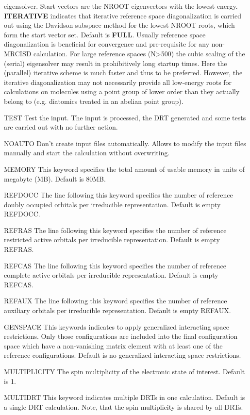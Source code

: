 \begin{keywordlist}
eigensolver. Start vectors are the NROOT eigenvectors with the lowest
energy. {\bf ITERATIVE} indicates that iterative reference space diagonalization
is carried out using the Davidson subspace method for the lowest NROOT 
roots, which form the start vector set. Default is {\bf FULL}. Usually
reference space diagonalization is beneficial for convergence and 
pre-requisite for any non-MRCISD calculation. For large reference 
spaces (N>500) the cubic scaling of the (serial) eigensolver may result in 
prohibitively long startup times. Here the (parallel) iterative scheme is much faster
and thus to be preferred. However, the iterative diagonalization may not 
necessarily provide all low-energy roots for calculations on molecules
using a point group of lower order than they actually belong to (e.g. diatomics
treated in an abelian point group).  
\item[TEST]
Test the input. The input is processed, the DRT generated
and some tests are carried out with no further action.
\item[NOAUTO]
Don't create input files automatically. Allows to modify the input
files manually and start the calculation without overwriting. 
\item[MEMORY]
This keyword specifies the total amount of usable memory in units of
megabyte (MB). Default is 80MB.
\item[REFDOCC]
The line following this keyword specifies the number of reference doubly
occupied orbitals per irreducible representation. Default is empty REFDOCC. 
\item[REFRAS]
The line following this keyword specifies the number of reference restricted 
active orbitals per irreducible representation. Default is empty REFRAS.
\item[REFCAS]
The line following this keyword specifies the number of reference complete 
active orbitals per irreducible representation. Default is empty REFCAS.
\item[REFAUX]
The line following this keyword specifies the number of reference  auxiliary 
orbitals per irreducible representation. Default is empty REFAUX.
\item[GENSPACE]
This keywords indicates to apply generalized interacting space restrictions.
Only those configurations are included into the final configuration space 
which have a non-vanishing matrix element with at least one of the 
reference configurations. Default is no generalized interacting space restrictions.
\item [MULTIPLICITY]
The spin multiplicity of the electronic state of interest. Default is 1.
\item[MULTIDRT]
This keyword indicates multiple DRTs in one calculation. Default is a 
single DRT calculation. Note, that the spin multiplicity is shared by 
all DRTs.
\end{keywordlist}

